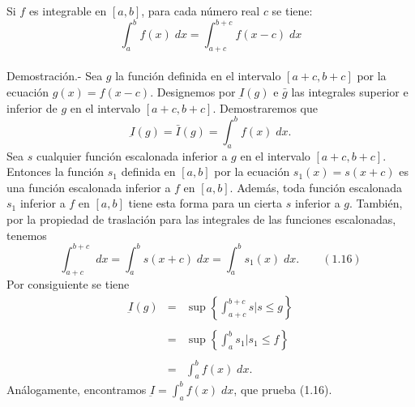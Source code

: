 \begin{multicols}{2}
\begin{teo} Si $f$ es integrable en $[a,b]$, para cada número real $c$ se tiene: $$\int_a^b f(x) \; dx = \int_{a+c}^{b+c} f(x-c)\; dx$$\\
    Demostración.-\; Sea $g$ la función definida en el intervalo $[a+c,b+c]$ por la ecuación $g(x) = f(x-c)$. Designemos por $\underbar{I}(g)$ e $\bar{g}$ las integrales superior e inferior de $g$ en el intervalo $[a+c,b+c]$. Demostraremos que $$\underbar{I}(g) = \bar{I}(g) = \int_a^b f(x) \; dx.$$
    Sea $s$ cualquier función escalonada inferior a $g$ en el intervalo $[a+c,b+c]$. Entonces la función $s_1$ definida en $[a,b]$ por la ecuación $s_1(x) = s(x+c)$ es una función escalonada inferior a $f$ en $[a,b]$. Además, toda función escalonada $s_1$ inferior a $f$ en $[a,b]$ tiene esta forma para un cierta $s$ inferior a $g$. También, por la propiedad de traslación para las integrales de las funciones escalonadas, tenemos $$\int_{a+c}^{b+c} \; dx = \int_a^b s(x+c)\; dx = \int_a^b s_1(x)\; dx. \qquad (1.16)$$
    Por consiguiente se tiene 
    $$\begin{array}{rcl}
	\underbar{I}(g) &=& \sup\left\{\int_{a+c}^{b+c} s | s \leq g\right\}\\\\
			&=&  \sup \left\{\int_a^b s_1 | s_1 \leq f\right\}\\\\
			&=&\displaystyle\int_a^b f(x) \; dx.
    \end{array}$$
    Análogamente, encontramos $\underbar{I} = \int_a^b f(x)\; dx$, que prueba (1.16).\\\\ 
    
\end{teo}


\end{multicols}
